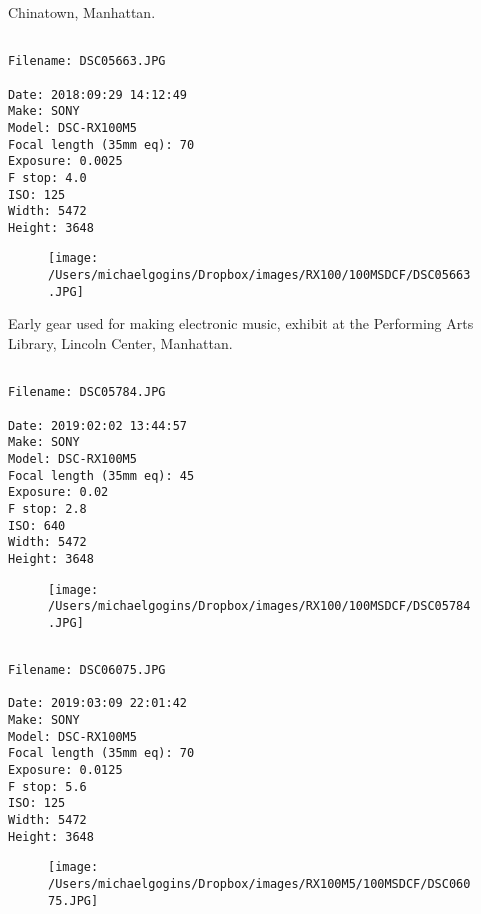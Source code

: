 \clearpage
\onecolumn
\noindent Chinatown, Manhattan.
\noindent
\begin{lstlisting}

Filename: DSC05663.JPG

Date: 2018:09:29 14:12:49
Make: SONY
Model: DSC-RX100M5
Focal length (35mm eq): 70
Exposure: 0.0025
F stop: 4.0
ISO: 125
Width: 5472
Height: 3648
\end{lstlisting}
\clearpage

\begin{figure}
\texttt{[image: /Users/michaelgogins/Dropbox/images/RX100/100MSDCF/DSC05663.JPG]}
\end{figure}
    
\clearpage
\onecolumn
\noindent Early gear used for making electronic music, exhibit at the Performing Arts Library, Lincoln Center, Manhattan.
\noindent
\begin{lstlisting}

Filename: DSC05784.JPG

Date: 2019:02:02 13:44:57
Make: SONY
Model: DSC-RX100M5
Focal length (35mm eq): 45
Exposure: 0.02
F stop: 2.8
ISO: 640
Width: 5472
Height: 3648
\end{lstlisting}
\clearpage

\begin{figure}
\texttt{[image: /Users/michaelgogins/Dropbox/images/RX100/100MSDCF/DSC05784.JPG]}
\end{figure}
    
\clearpage
\onecolumn
\noindent 
\noindent
\begin{lstlisting}

Filename: DSC06075.JPG

Date: 2019:03:09 22:01:42
Make: SONY
Model: DSC-RX100M5
Focal length (35mm eq): 70
Exposure: 0.0125
F stop: 5.6
ISO: 125
Width: 5472
Height: 3648
\end{lstlisting}
\clearpage

\begin{figure}
\texttt{[image: /Users/michaelgogins/Dropbox/images/RX100M5/100MSDCF/DSC06075.JPG]}
\end{figure}
    
